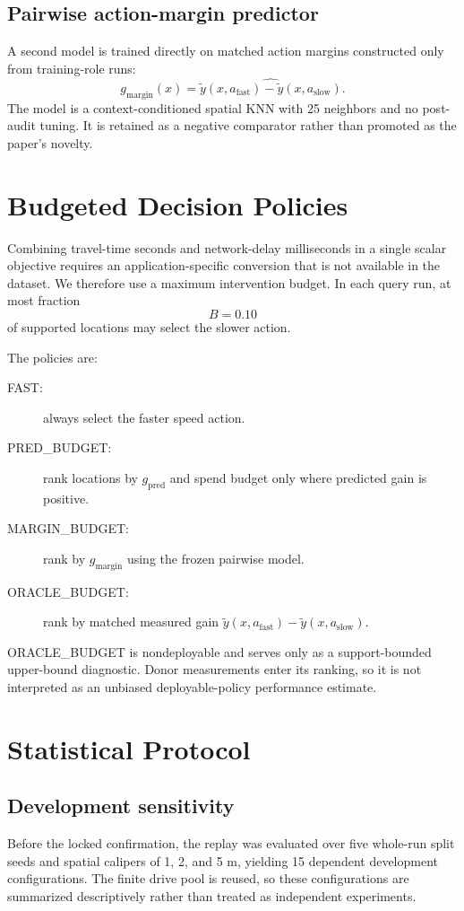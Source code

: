 \documentclass[journal]{IEEEtran}
\begin{document}
\subsection{Pairwise action-margin predictor}
A second model is trained directly on matched action margins constructed only from training-role runs:
\begin{equation}
g_{\mathrm{margin}}(x)
=
\widehat{\tilde y(x,a_{\mathrm{fast}})
-\tilde y(x,a_{\mathrm{slow}})}.
\end{equation}
The model is a context-conditioned spatial KNN with 25 neighbors and no post-audit tuning. It is retained as a negative comparator rather than promoted as the paper's novelty.

\section{Budgeted Decision Policies}
Combining travel-time seconds and network-delay milliseconds in a single scalar objective requires an application-specific conversion that is not available in the dataset. We therefore use a maximum intervention budget. In each query run, at most fraction
\begin{equation}
B=0.10
\end{equation}
of supported locations may select the slower action.

The policies are:
\begin{description}
\item[FAST:] always select the faster speed action.
\item[PRED\_BUDGET:] rank locations by $g_{\mathrm{pred}}$ and spend budget only where predicted gain is positive.
\item[MARGIN\_BUDGET:] rank by $g_{\mathrm{margin}}$ using the frozen pairwise model.
\item[ORACLE\_BUDGET:] rank by matched measured gain $\tilde y(x,a_{\mathrm{fast}})-\tilde y(x,a_{\mathrm{slow}})$.
\end{description}

ORACLE\_BUDGET is nondeployable and serves only as a support-bounded upper-bound diagnostic. Donor measurements enter its ranking, so it is not interpreted as an unbiased deployable-policy performance estimate.

\section{Statistical Protocol}
\subsection{Development sensitivity}
Before the locked confirmation, the replay was evaluated over five whole-run split seeds and spatial calipers of 1, 2, and 5 m, yielding 15 dependent development configurations. The finite drive pool is reused, so these configurations are summarized descriptively rather than treated as independent experiments.
\end{document}
